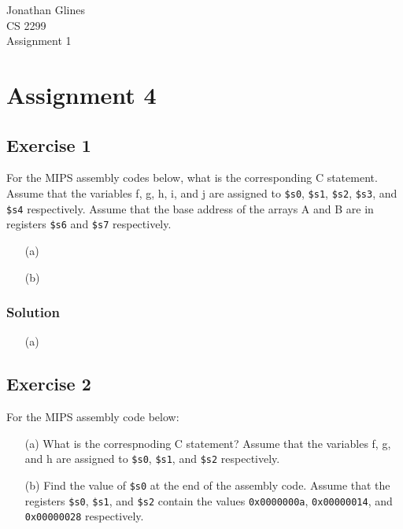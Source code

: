\documentclass[12pt]{article}
\begin{document}
\begin{flushright}
{\Large Jonathan Glines \\
CS 2299 \\
Assignment 1 \\
}
\end{flushright}
\section*{Assignment 4}
\subsection*{Exercise 1}
For the MIPS assembly codes below, what is the corresponding C statement. Assume that the variables f, g, h, i, and j are assigned to {\tt \$s0}, {\tt \$s1}, {\tt \$s2}, {\tt \$s3}, and {\tt \$s4} respectively. Assume that the base address of the arrays A and B are in registers {\tt \$s6} and {\tt \$s7} respectively.
\begin{itemize}
\item[(a)]


\item[(b)]

\end{itemize}
\subsubsection*{Solution}
\begin{itemize}
\item[(a)]

\end{itemize}

\subsection*{Exercise 2}
For the MIPS assembly code below:
\begin{itemize}
\item[(a)] What is the correspnoding C statement? Assume that the variables f, g, and h are assigned to {\tt \$s0}, {\tt \$s1}, and {\tt \$s2} respectively.
\item[(b)] Find the value of {\tt \$s0} at the end of the assembly code. Assume that the registers {\tt \$s0}, {\tt \$s1}, and {\tt \$s2} contain the values {\tt 0x0000000a}, {\tt 0x00000014}, and {\tt 0x00000028} respectively.
\end{itemize}

\end{document}

